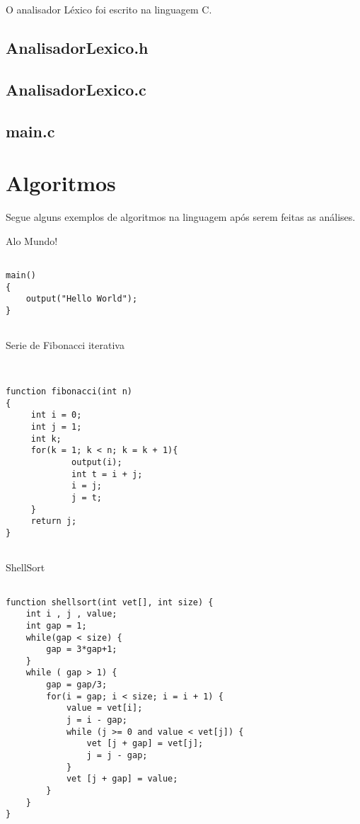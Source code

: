 \documentclass{article}
\begin{document}
	O analisador Léxico foi escrito na linguagem C.
	
\subsection{AnalisadorLexico.h}




	
\newpage

\subsection{AnalisadorLexico.c}



\newpage

\subsection{main.c}


	
\newpage	
	
\section{Algoritmos}
Segue alguns exemplos de algoritmos na linguagem após serem feitas as análises.

Alo Mundo!

\begin{verbatim}

main()
{
	output("Hello World");
}


\end{verbatim}



\newpage
Serie de Fibonacci iterativa
\begin{verbatim}


function fibonacci(int n)
{
     int i = 0;
     int j = 1;
     int k;
     for(k = 1; k < n; k = k + 1){
             output(i);
             int t = i + j;
             i = j;
             j = t;
     }
     return j;
}


\end{verbatim}



\newpage

ShellSort

\begin{verbatim}

function shellsort(int vet[], int size) {
    int i , j , value;
    int gap = 1;
    while(gap < size) {
        gap = 3*gap+1;
    }
    while ( gap > 1) {
        gap = gap/3;
        for(i = gap; i < size; i = i + 1) {
            value = vet[i];
            j = i - gap;
            while (j >= 0 and value < vet[j]) {
                vet [j + gap] = vet[j];
                j = j - gap;
            }
            vet [j + gap] = value;
        }
    }
}

\end{verbatim}


\end{document}
